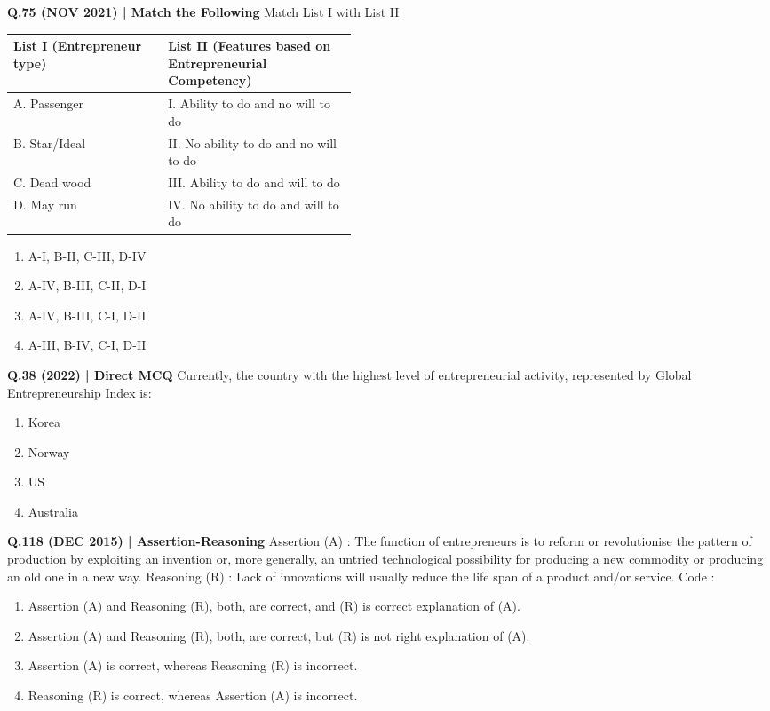 \documentclass{article}
\begin{document}
\textbf{Q.75 (NOV 2021) | Match the Following}
Match List I with List II
\begin{tabularx}{\linewidth}{@{} p{0.45\linewidth} X @{}}
    \toprule
    \textbf{List I (Entrepreneur type)} & \textbf{List II (Features based on Entrepreneurial Competency)} \\
    \midrule
    A. Passenger & I. Ability to do and no will to do \\
    B. Star/Ideal & II. No ability to do and no will to do \\
    C. Dead wood & III. Ability to do and will to do \\
    D. May run & IV. No ability to do and will to do \\
    \bottomrule
\end{tabularx}
\begin{enumerate}[label=(\arabic*)]
    \item A-I, B-II, C-III, D-IV
    \item A-IV, B-III, C-II, D-I
    \item A-IV, B-III, C-I, D-II
    \item A-III, B-IV, C-I, D-II
\end{enumerate}

\textbf{Q.38 (2022) | Direct MCQ}
Currently, the country with the highest level of entrepreneurial activity, represented by Global Entrepreneurship Index is:
\begin{enumerate}[label=(\arabic*)]
    \item Korea
    \item Norway
    \item US
    \item Australia
\end{enumerate}

\textbf{Q.118 (DEC 2015) | Assertion-Reasoning}
Assertion (A) : The function of entrepreneurs is to reform or revolutionise the pattern of production by exploiting an invention or, more generally, an untried technological possibility for producing a new commodity or producing an old one in a new way.
Reasoning (R) : Lack of innovations will usually reduce the life span of a product and/or service.
Code :
\begin{enumerate}[label=(\arabic*)]
    \item Assertion (A) and Reasoning (R), both, are correct, and (R) is correct explanation of (A).
    \item Assertion (A) and Reasoning (R), both, are correct, but (R) is not right explanation of (A).
    \item Assertion (A) is correct, whereas Reasoning (R) is incorrect.
    \item Reasoning (R) is correct, whereas Assertion (A) is incorrect.
\end{enumerate}
\end{document}
